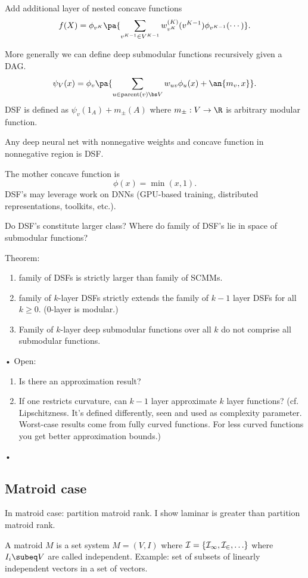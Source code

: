 Add additional layer of nested concave functions
$$
f(X) = \phi_{v^K}\pa{\sum_{v^{K-1}\in V^{K-1}} w_{v^K}^{(K)} (v^{K-1}) \phi_{v^{K-1}}(\cdots)}.
$$

More generally we can define deep submodular functions recursively given a DAG.
$$
\psi_V(x) = \phi_v\pa{\sum_{u\in \text{parent}(v)\bs V} w_{uv}\phi_u(x) + \an{m_v,x}}.
$$
DSF is defined as $\psi_v(1_A)+m_\pm (A)$ where $m_\pm :V\to \R$ is arbitrary modular function.

Any deep neural net with nonnegative weights and concave function in nonnegative region is DSF.

The mother concave function is
$$
\phi(x) = \min(x,1).
$$
DSF's may leverage work on DNNs (GPU-based training, distributed representations, toolkits, etc.).

Do DSF's constitute larger class? Where do family of DSF's lie in space of submodular functions?

Theorem: 
\begin{enumerate}
\item
family of DSFs is strictly larger than family of SCMMs.
\item
family of $k$-layer DSFs strictly extends the family of $k-1$ layer DSFs for all $k\ge 0$. (0-layer is modular.)
\item
Family of $k$-layer deep submodular functions over all $k$ do not comprise all submodular functions.
\end{enumerate}•
Open: 
\begin{enumerate}
\item
Is there an approximation result? 
\item
If one restricts curvature, can $k-1$ layer approximate $k$ layer functions? (cf. Lipschitzness. It's defined differently, seen and used as complexity parameter. Worst-case results come from fully curved functions. For less curved functions you get better approximation bounds.)
\end{enumerate}•

\subsection{Matroid case}
In matroid case: partition matroid rank. I show laminar is greater than partition matroid rank.

A matroid $M$ is a set system $M=(V,I)$ where $\cal I=\{I_1,I_2,\ldots\}$ where $I_i\subeq V$ are called independent.
Example: set of subsets of linearly independent vectors in a set of vectors.

